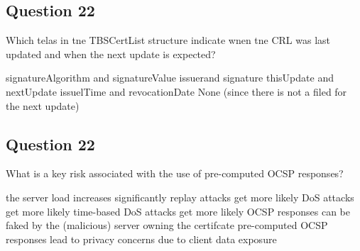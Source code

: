 \subsection*{Question 22}
Which telas in tne TBSCertList structure indicate wnen tne CRL was last updated and when the next update is expected?
\begin{itemize}
  \incorrect signatureAlgorithm and signatureValue
  \incorrect issuerand signature
  \correct thisUpdate and nextUpdate %
  \incorrect issuelTime and revocationDate
  \incorrect None (since there is not a filed for the next update)
\end{itemize}

\subsection*{Question 22}
What is a key risk associated with the use of pre-computed OCSP responses?
\begin{itemize}
  \incorrect the server load increases significantly replay attacks get more likely
  \incorrect DoS attacks get more likely time-based 
  \incorrect DoS attacks get more likely
  \incorrect OCSP responses can be faked by the (malicious) server owning the certifcate
  \incorrect pre-computed OCSP responses lead to privacy concerns due to client data exposure
\end{itemize}
